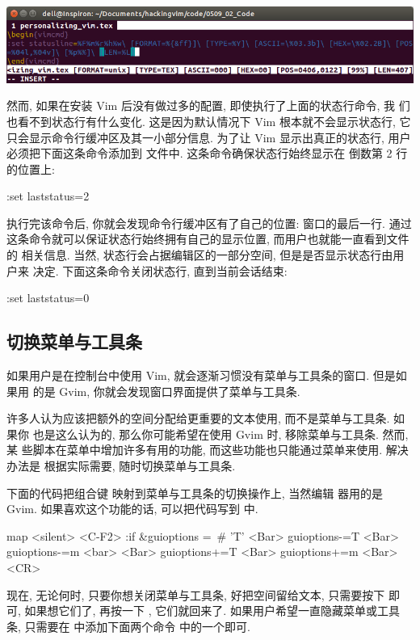 \begin{center}
    \includegraphics[scale=0.55]{images/page27.png}
\end{center}
然而, 如果在安装 Vim 后没有做过多的配置, 即使执行了上面的状态行命令, 我
们也看不到状态行有什么变化. 这是因为默认情况下 Vim 根本就不会显示状态行,
它只会显示命令行缓冲区及其一小部分信息. 为了让 Vim 显示出真正的状态行, 用户
必须把下面这条命令添加到  文件中. 这条命令确保状态行始终显示在
倒数第 2 行的位置上:
\begin{vimcmd}
:set laststatus=2
\end{vimcmd}
执行完该命令后, 你就会发现命令行缓冲区有了自己的位置: 窗口的最后一行. 通过
这条命令就可以保证状态行始终拥有自己的显示位置, 而用户也就能一直看到文件的
相关信息. 当然, 状态行会占据编辑区的一部分空间, 但是是否显示状态行由用户来
决定. 下面这条命令关闭状态行, 直到当前会话结束:
\begin{vimcmd}
:set laststatus=0
\end{vimcmd}

\subsection{切换菜单与工具条}
\label{subsec:toggle_menu_and_toolbar}
如果用户是在控制台中使用 Vim, 就会逐渐习惯没有菜单与工具条的窗口. 但是如果用
的是 Gvim, 你就会发现窗口界面提供了菜单与工具条.

许多人认为应该把额外的空间分配给更重要的文本使用, 而不是菜单与工具条. 如果你 
也是这么认为的, 那么你可能希望在使用 Gvim 时, 移除菜单与工具条. 然而, 某
些脚本在菜单中增加许多有用的功能, 而这些功能也只能通过菜单来使用. 解决办法是
根据实际需要, 随时切换菜单与工具条.

下面的代码把组合键  映射到菜单与工具条的切换操作上, 当然编辑
器用的是 Gvim. 如果喜欢这个功能的话, 可以把代码写到  中.
\begin{vimcmd}
map <silent> <C-F2> :if &guioptions =~# 'T' <Bar>
                         \set guioptions-=T <Bar>
                         \set guioptions-=m <bar>
                    \else <Bar>
                         \set guioptions+=T <Bar>
                         \set guioptions+=m <Bar>
                      \endif<CR>
\end{vimcmd}
现在, 无论何时, 只要你想关闭菜单与工具条, 好把空间留给文本, 只需要按下
 即可, 如果想它们了, 再按一下 , 它们就回来了.
如果用户希望一直隐藏菜单或工具条, 只需要在  中添加下面两个命令
中的一个即可.

